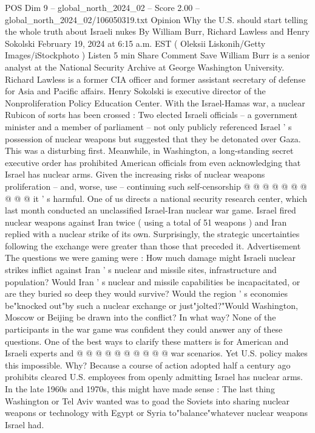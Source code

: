 \begin{textsample}{POS Dim 9 – global\_north\_2024\_02 – Score 2.00 – global\_north\_2024\_02/106050319.txt}  \label{ex:f9_pos_163}
Opinion Why the U.S. should start telling the whole truth about Israeli nukes By William Burr, Richard Lawless and Henry Sokolski February 19, 2024 at 6:15 a.m.
EST ( Oleksii Liskonih/Getty Images/iStockphoto ) Listen 5 min Share Comment Save William Burr is a senior analyst at the National Security Archive at George Washington University.
Richard Lawless is a former CIA officer and former assistant secretary of defense for Asia and Pacific affairs.
Henry Sokolski is executive director of the Nonproliferation Policy Education Center.
With the Israel-Hamas war, a nuclear Rubicon of sorts has been crossed : Two elected Israeli officials -- a government minister and a member of parliament -- not only publicly referenced Israel ' s possession of nuclear weapons but suggested that they be detonated over Gaza.
This was a disturbing first.
Meanwhile, in Washington, a long-standing secret executive order has prohibited American officials from even acknowledging that Israel has nuclear arms.
Given the increasing risks of nuclear weapons proliferation -- and, worse, use -- continuing such self-censorship @ @ @ @ @ @ @ @ @ @ it ' s harmful.
One of us directs a national security research center, which last month conducted an unclassified Israel-Iran nuclear war game.
Israel fired nuclear weapons against Iran twice ( using a total of 51 weapons ) and Iran replied with a nuclear strike of its own.
Surprisingly, the strategic uncertainties following the exchange were greater than those that preceded it.
Advertisement The questions we were gaming were : How much damage might Israeli nuclear strikes inflict against Iran ' s nuclear and missile sites, infrastructure and population?
Would Iran ' s nuclear and missile capabilities be incapacitated, or are they buried so deep they would survive?
Would the region ' s economies be"knocked out"by such a nuclear exchange or just"jolted?"Would Washington, Moscow or Beijing be drawn into the conflict?
In what way?
None of the participants in the war game was confident they could answer any of these questions.
One of the best ways to clarify these matters is for American and Israeli experts and @ @ @ @ @ @ @ @ @ @ war scenarios.
Yet U.S. policy makes this impossible.
Why?
Because a course of action adopted half a century ago prohibits cleared U.S. employees from openly admitting Israel has nuclear arms.
In the late 1960s and 1970s, this might have made sense : The last thing Washington or Tel Aviv wanted was to goad the Soviets into sharing nuclear weapons or technology with Egypt or Syria to"balance"whatever nuclear weapons Israel had.

\end{textsample}
